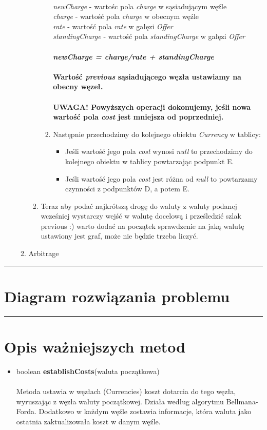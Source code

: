 \documentclass[a4paper,11pt]{article}
\newcommand{\linia}{\rule{\linewidth}{0.4mm}}
\begin{document}
\begin{enumerate}
\begin{enumerate}
\begin{enumerate}
\begin{enumerate}
\\\textit{newCharge} - wartośc pola \textit{charge} w sąsiadującym węźle
\\ \textit{charge} - wartość pola \textit{charge} w obecnym węźle
\\ \textit{rate} - wartość pola \textit{rate} w gałęzi \textit{Offer}
\\ \textit{standingCharge} - wartość pola \textit{standingCharge} w gałęzi \textit{Offer}
\\
\\ \textbf{\emph{newCharge = charge/rate + standingCharge }}
\\
\\\textbf{Wartość \textit{previous} sąsiadującego węzła ustawiamy na obecny węzeł.}
\\
\textbf{\\ UWAGA! Powyższych operacji dokonujemy, jeśli nowa wartość pola \textit{cost} jest mniejsza od poprzedniej.}
\\
\item  Następnie przechodzimy do kolejnego obiektu \textit{Currency} w tablicy:
\begin{itemize}
\item Jeśli wartość jego pola \textit{cost} wynosi \textit{null} to przechodzimy do kolejnego obiektu w tablicy powtarzając podpunkt E.
\item Jeśli wartość jego pola \textit{cost} jest różna od \textit{null} to powtarzamy czynności z podpunktów D, a potem E.
\end{itemize}
\end{enumerate}
\item Teraz aby podać najkrótszą drogę do waluty z waluty podanej wcześniej wystarczy wejść w walutę docelową i prześledzić szlak previous :) warto dodać na początek sprawdzenie na jaką walutę ustawiony jest graf, może nie będzie trzeba liczyć.
\end{enumerate} 
\item Arbitrage
\end{enumerate}
\end{enumerate}

\noindent\linia
\section{Diagram rozwiązania problemu}


\noindent\linia
\section{Opis ważniejszych metod}
\begin{itemize}
\item boolean \textbf{establishCosts}(waluta początkowa)
\\\\
Metoda ustawia w węzłach (Currencies) koszt dotarcia do tego węzła, wyruszając z węzła waluty początkowej. Działa według algorytmu Bellmana-Forda.
Dodatkowo w każdym węźle zostawia informacje, która waluta jako ostatnia zaktualizowała koszt w danym węźle.
\end{itemize}
\end{document}
